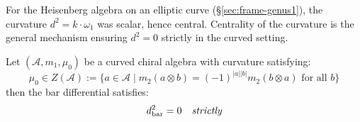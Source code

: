 \begin{theorem}\label{thm:central-implies-strict}
For the Heisenberg algebra on an elliptic curve (\S\ref{sec:frame-genus1}), the curvature $d^2 = k \cdot \omega_1$ was scalar, hence central.  Centrality of the curvature is the general mechanism ensuring $d^2 = 0$ strictly in the curved setting.

Let $(\mathcal{A}, m_1, \mu_0)$ be a curved chiral algebra with curvature satisfying:
\begin{equation}
\mu_0 \in Z(\mathcal{A}) := \{a \in \mathcal{A} \mid m_2(a \otimes b) = (-1)^{|a||b|}m_2(b \otimes a)
\text{ for all } b\}
\end{equation}
then the bar differential satisfies:
\begin{equation}
d_{\text{bar}}^2 = 0 \quad \emph{strictly}
\end{equation}
\end{theorem}


